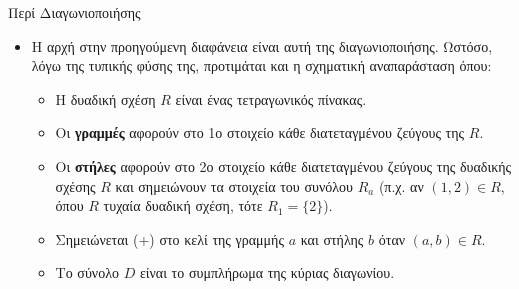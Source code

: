 \documentclass[size=14pt, paper=smartboard, style=fyma, mode=present]{powerdot}
\begin{document}
\begin{slide}[toc=]{Περί Διαγωνιοποιήσης}
	\large
{	\begin{itemize}
		\item Η αρχή στην προηγούμενη διαφάνεια είναι αυτή της διαγωνιοποιήσης. Ωστόσο, λόγω της τυπικής φύσης της, προτιμάται και η σχηματική αναπαράσταση όπου:
		\begin{itemize}
			\item Η δυαδική σχέση $R$ είναι ένας τετραγωνικός πίνακας. \pause
			\item Οι \textbf{γραμμές} αφορούν στο 1ο στοιχείο κάθε διατεταγμένου ζεύγους της $R$. \pause
			\item Οι \textbf{στήλες} αφορούν στο 2ο στοιχείο κάθε διατεταγμένου ζεύγους της δυαδικής σχέσης $R$ και σημειώνουν τα στοιχεία του συνόλου $R_a$ (π.χ. αν $(1,2) \in R$, όπου $R$ τυχαία δυαδική σχέση, τότε $R_1 = \{2\}$). \pause
			\item Σημειώνεται (+) στο κελί της γραμμής $a$ και στήλης $b$ όταν $(a,b) \in R$. \pause
			\item Το σύνολο $D$ είναι το συμπλήρωμα της κύριας διαγωνίου.
		\end{itemize}
	\end{itemize}
} 
\end{slide}
\end{document}
